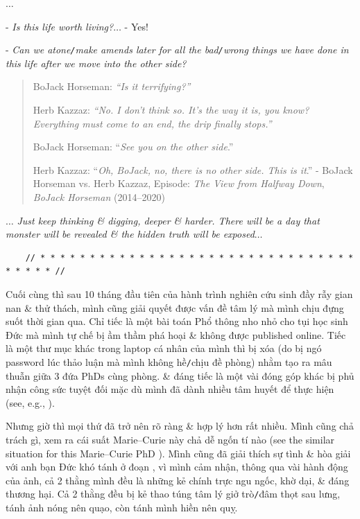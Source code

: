 \documentclass[12pt]{article}
\begin{document}
$\ldots$

- {\it Is this life worth living?}$\ldots$ - Yes!

- {\it Can we atone{\tt/}make amends later for all the bad{\tt/}wrong things we have done in this life after we move into the other side?}
\begin{quote}    
	BoJack Horseman: {\it ``Is it terrifying?''}
	
	Herb Kazzaz: {\it ``No. I don't think so. It's the way it is, you know? Everything must come to an end, the drip finally stops.''}
	
	BoJack Horseman: ``{\it See you on the other side}.''
	
	Herb Kazzaz: ``{\it Oh, BoJack, no, there is no other side. This is it}.'' - BoJack Horseman vs. Herb Kazzaz,  Episode: {\it The View from Halfway Down}, {\it BoJack Horseman} (2014--2020)
\end{quote}
$\ldots$ {\it Just keep thinking \& digging, deeper \& harder. There will be a day that monster will be revealed \& the hidden truth will be exposed}$\ldots$

\begin{verbatim}
	// * * * * * * * * * * * * * * * * * * * * * * * * * * * * * * * * * * * * * //
\end{verbatim}

\noindent
{} Cuối cùng thì sau 10 tháng đầu tiên của hành trình nghiên cứu sinh đầy rẫy gian nan \& thử thách, mình cũng giải quyết được vấn đề tâm lý mà mình chịu đựng suốt thời gian qua. Chỉ tiếc là một bài toán Phổ thông nho nhỏ cho tụi học sinh Đức mà mình tự chế bị ầm thầm phá hoại \& không được published online. Tiếc là một thư mục khác trong laptop cá nhân của mình thì bị xóa (do bị ngó password lúc thảo luận mà mình không hề{\tt/}chịu đề phòng) nhằm tạo ra mâu thuẫn giữa 3 đứa PhDs cùng phòng. \& đáng tiếc là một vài đóng góp khác bị phủ nhận công sức tuyệt đối mặc dù mình đã dành nhiều tâm huyết để thực hiện (see, e.g., \cite{phill2018,Young-Powell2018}).

Nhưng giờ thì mọi thứ đã trở nên rõ ràng \& hợp lý hơn rất nhiều. Mình cũng chả trách gì, xem ra cái suất Marie--Curie này chả dễ ngốn tí nào (see the similar situation for this Marie--Curie PhD \cite{FundamentalPessimist2020}). Mình cũng đã giải thích sự tình \& hòa giải với anh bạn Đức khó tánh ở đoạn , vì mình cảm nhận, thông qua vài hành động của ảnh, cả 2 thằng mình đều là những kẻ chính trực ngu ngốc, khờ dại, \& đáng thương hại. Cả 2 thằng đều bị kẻ thao túng tâm lý giở trò{\tt/}đâm thọt sau lưng, tánh ảnh nóng nên quạo, còn tánh mình hiền nên quỵ.
\end{document}
